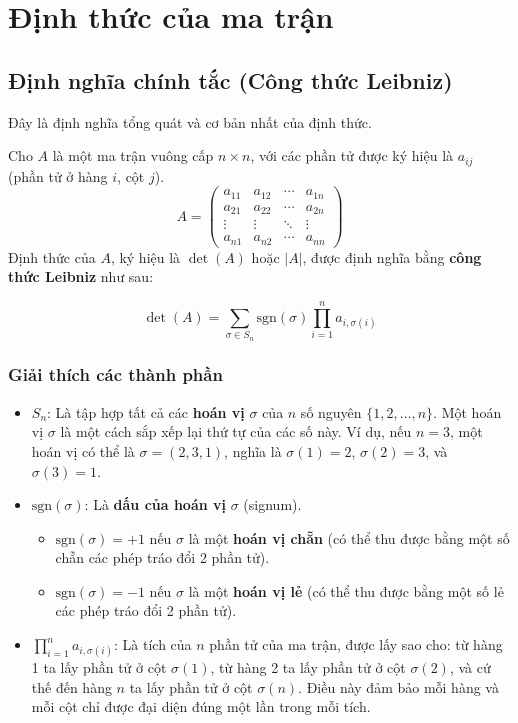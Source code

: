 
\chapter{Định thức của ma trận}

\section{Định nghĩa chính tắc (Công thức Leibniz)}

Đây là định nghĩa tổng quát và cơ bản nhất của định thức.

Cho $A$ là một ma trận vuông cấp $n \times n$, với các phần tử được ký hiệu là $a_{ij}$ (phần tử ở hàng $i$, cột $j$).
$$ A = \begin{pmatrix}
a_{11} & a_{12} & \cdots & a_{1n} \\
a_{21} & a_{22} & \cdots & a_{2n} \\
\vdots & \vdots & \ddots & \vdots \\
a_{n1} & a_{n2} & \cdots & a_{nn}
\end{pmatrix} $$
Định thức của $A$, ký hiệu là $\det(A)$ hoặc $|A|$, được định nghĩa bằng \textbf{công thức Leibniz} như sau:

$$ \det(A) = \sum_{\sigma \in S_n} \text{sgn}(\sigma) \prod_{i=1}^{n} a_{i, \sigma(i)} $$

\subsection*{Giải thích các thành phần}
\begin{itemize}
    \item \textbf{$S_n$}: Là tập hợp tất cả các \textbf{hoán vị} $\sigma$ của $n$ số nguyên $\{1, 2, \dots, n\}$. Một hoán vị $\sigma$ là một cách sắp xếp lại thứ tự của các số này. Ví dụ, nếu $n=3$, một hoán vị có thể là $\sigma = (2, 3, 1)$, nghĩa là $\sigma(1)=2$, $\sigma(2)=3$, và $\sigma(3)=1$.
    
    \item \textbf{$\text{sgn}(\sigma)$}: Là \textbf{dấu của hoán vị} $\sigma$ (signum).
    \begin{itemize}
        \item $\text{sgn}(\sigma) = +1$ nếu $\sigma$ là một \textbf{hoán vị chẵn} (có thể thu được bằng một số chẵn các phép tráo đổi 2 phần tử).
        \item $\text{sgn}(\sigma) = -1$ nếu $\sigma$ là một \textbf{hoán vị lẻ} (có thể thu được bằng một số lẻ các phép tráo đổi 2 phần tử).
    \end{itemize}
    
    \item \textbf{$\prod_{i=1}^{n} a_{i, \sigma(i)}$}: Là tích của $n$ phần tử của ma trận, được lấy sao cho: từ hàng 1 ta lấy phần tử ở cột $\sigma(1)$, từ hàng 2 ta lấy phần tử ở cột $\sigma(2)$, và cứ thế đến hàng $n$ ta lấy phần tử ở cột $\sigma(n)$. Điều này đảm bảo mỗi hàng và mỗi cột chỉ được đại diện đúng một lần trong mỗi tích.
\end{itemize}

